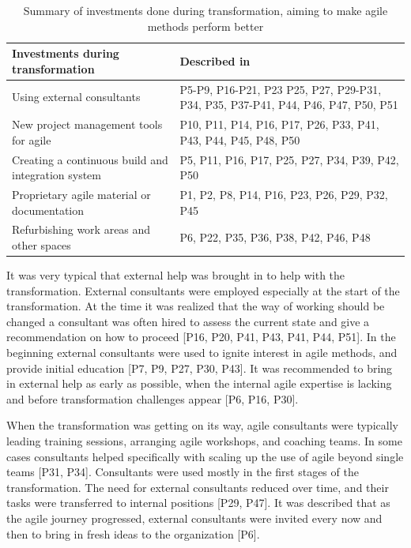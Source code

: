 \documentclass[preprint,authoryear,12pt]{elsarticle}
\begin{document}
\begin{table}[h]
    \centering
    \begin{tabular}{ >{\raggedright\arraybackslash}p{}
                     >{\raggedright\arraybackslash}p{} }
        \toprule
        Investments during transformation      &  Described in  \\
        \midrule
        Using external consultants  &
                P5-P9, P16-P21, P23 P25, P27, P29-P31,
                P34, P35, P37-P41, P44, P46, P47, P50, P51  \\  %
        New project management tools for agile  &
                P10, P11, P14, P16, P17, P26, P33,
                P41, P43, P44, P45, P48, P50 \\
        Creating a continuous build and integration system  &
                P5, P11, P16, P17, P25, P27, P34, P39, P42, P50 \\
        Proprietary agile material or documentation   & 
                P1, P2, P8, P14, P16, P23, P26, P29, P32, P45  \\
        Refurbishing work areas and other spaces   &
                P6, P22, P35, P36, P38, P42, P46, P48 \\
        \bottomrule
    \end{tabular}
    \caption{Summary of investments done during transformation, aiming to make
             agile methods perform better}
    \label{table:transformation_investments}
\end{table}



It was very typical that external help was brought in to help with the
transformation.
External consultants were employed especially at the start of the
transformation. At the time it was realized that the way of working should be
changed a consultant was often hired to assess the current state and give a
recommendation on how to proceed [P16, P20, P41, P43, P41, P44, P51].
In the beginning external consultants were used to ignite interest in agile
methods, and provide initial education [P7, P9, P27, P30, P43].
It was recommended to bring in external help as early as possible, when the
internal agile expertise is lacking and before transformation challenges appear
[P6, P16, P30].

When the transformation was getting on its way, agile consultants were typically
leading training sessions, arranging agile workshops, and coaching teams.
In some cases consultants helped specifically with scaling up the use of agile
beyond single teams [P31, P34].
Consultants were used mostly in the first stages of the transformation.
The need for external consultants reduced over time, and their tasks were
transferred to internal positions [P29, P47].
It was described that as the agile journey progressed, external consultants were
invited every now and then to bring in fresh ideas to the organization [P6].
\end{document}
